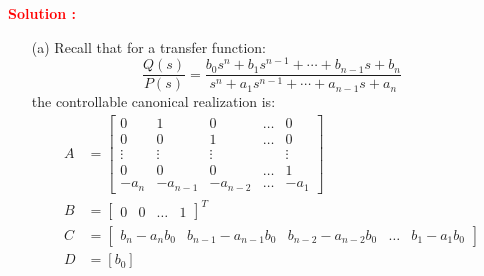 \documentclass[12pt]{article}
\begin{document}
\textbf{\textcolor{red}{Solution :}} \\
\begin{itemize}
    \item [(a)] Recall that for a transfer function:
$$
\frac{Q(s)}{P(s)}=\frac{b_0 s^n+b_1 s^{n-1}+\cdots+b_{n-1} s+b_n}{s^n+a_1 s^{n-1}+\cdots+a_{n-1} s+a_n}
$$
the controllable canonical realization is:
$$
\begin{aligned}
A & =\left[\begin{array}{ccccc}
0 & 1 & 0 & \ldots & 0 \\
0 & 0 & 1 & \ldots & 0 \\
\vdots & \vdots & \vdots & & \vdots \\
0 & 0 & 0 & \ldots & 1 \\
-a_n & -a_{n-1} & -a_{n-2} & \ldots & -a_1
\end{array}\right] \\
B & =\left[\begin{array}{llllll}
0 & 0 & \ldots & 1
\end{array}\right]^T \\
C & =\left[\begin{array}{lllll}
b_n-a_n b_0 & b_{n-1}-a_{n-1} b_0 & b_{n-2}-a_{n-2} b_0 & \ldots & b_1-a_1 b_0
\end{array}\right] \\
D & =\left[b_0\right]
\end{aligned}
$$


\end{itemize}
\end{document}

